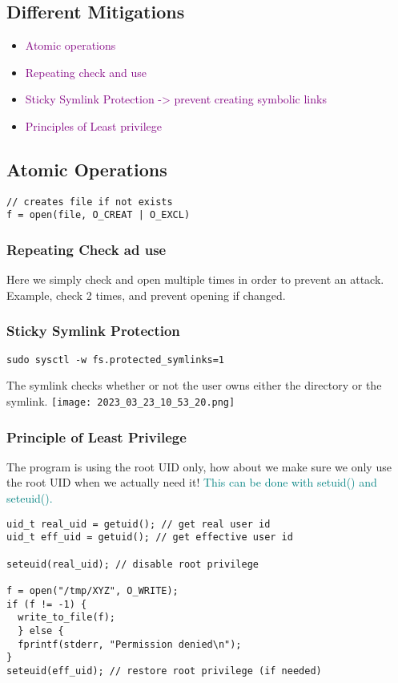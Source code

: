 \documentclass[main.tex,fontsize=8pt,paper=a4,paper=portrait,DIV=calc,]{scrartcl}
\begin{document}
\subsection{Different Mitigations}
\begin{itemize}
\item \textcolor{purple}{Atomic operations}
\item \textcolor{purple}{Repeating check and use}
\item \textcolor{purple}{Sticky Symlink Protection -> prevent creating symbolic links}
\item \textcolor{purple}{Principles of Least privilege}
\end{itemize} 

\subsection{Atomic Operations}
\begin{lstlisting}
// creates file if not exists
f = open(file, O_CREAT | O_EXCL)
\end{lstlisting}

\subsubsection{Repeating Check ad use}
Here we simply check and open multiple times in order to prevent an attack.\newline
Example, check 2 times, and prevent opening if changed. 

\subsubsection{Sticky Symlink Protection}
\begin{lstlisting}
sudo sysctl -w fs.protected_symlinks=1
\end{lstlisting}
The symlink checks whether or not the user owns either the directory or the symlink.\newline
\texttt{[image: 2023\_03\_23\_10\_53\_20.png]}

\subsubsection{Principle of Least Privilege}
The program is using the root UID only, how about we make sure we only use the root UID when we actually need it!\newline
\textcolor{teal}{This can be done with setuid() and seteuid().}
\begin{lstlisting}
uid_t real_uid = getuid(); // get real user id
uid_t eff_uid = getuid(); // get effective user id

seteuid(real_uid); // disable root privilege

f = open("/tmp/XYZ", O_WRITE);
if (f != -1) {
  write_to_file(f);
  } else {
  fprintf(stderr, "Permission denied\n");
}
seteuid(eff_uid); // restore root privilege (if needed)
\end{lstlisting}
\end{document}
